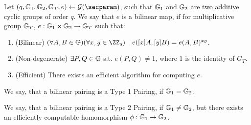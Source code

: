 
\begin{definition}
Let $(q, \Group_1, \Group_2, \Group_T, e) \gets \setup(\secparam)$, such that $\mathbb{G}_1$ and $\mathbb{G}_2$ are two additive cyclic groups of order $q$. We say that $e$ is a bilinear map, if for multiplicative group $\mathbb{G}_T$, $e: \mathbb{G}_1 \times \mathbb{G}_2 \rightarrow \mathbb{G}_T$ such that:
\begin{enumerate}
    \item (Bilinear) $(\forall A, B \in \Group)(\forall x, y \in \ZZ_q) \quad e([x]A, [y]B) = e(A, B)^{xy}$.
    \item (Non-degenerate) $\exists P, Q \in \mathbb{G}$ s.t. $e(P,Q) \neq 1$, where $1$ is the identity of $G_T$.
    \item (Efficient) There exists an efficient algorithm for computing $e$.
\end{enumerate}
\end{definition}

\begin{definition}
We say, that a bilinear pairing is a Type 1 Pairing, if $\mathbb{G}_1 = \mathbb{G}_2$.
\end{definition}

\begin{definition}
We say, that a bilinear pairing is a Type 2 Pairing, if $\mathbb{G}_1 \neq \mathbb{G}_2$, but there exists an efficiently computable homomorphism $\phi: \mathbb{G}_1 \rightarrow \mathbb{G}_2$.
\end{definition}

